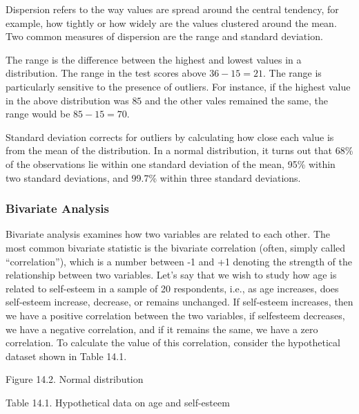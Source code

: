 Dispersion refers to the way values are spread around the central tendency, for example, how tightly or how widely are the values clustered around the mean. Two common measures of dispersion are the range and standard deviation. 

The range is the difference between the highest and lowest values in a distribution. The range in the test scores above $ 36 - 15 = 21 $. The range is particularly sensitive to the presence of outliers. For instance, if the highest value in the above distribution was $ 85 $ and the other vales remained the same, the range would be $ 85 - 15 = 70 $. 

Standard deviation corrects for outliers by calculating how close each value is from the mean of the distribution. In a normal distribution, it turns out that 68\% of the observations lie within one standard deviation of the mean, 95\% within two standard deviations, and 99.7\% within three standard deviations.

\subsubsection{Bivariate Analysis}

Bivariate analysis examines how two variables are related to each other. The most common bivariate statistic is the bivariate correlation (often, simply called “correlation”), which is a number between -1 and +1 denoting the strength of the relationship between two variables. Let’s say that we wish to study how age is related to self-esteem in a sample of 20 respondents, i.e., as age increases, does self-esteem increase, decrease, or remains unchanged. If self-esteem increases, then we have a positive correlation between the two variables, if selfesteem decreases, we have a negative correlation, and if it remains the same, we have a zero correlation. To calculate the value of this correlation, consider the hypothetical dataset shown in Table 14.1.

Figure 14.2. Normal distribution

Table 14.1. Hypothetical data on age and self-esteem

